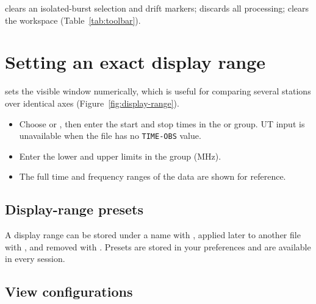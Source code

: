  clears an isolated-burst selection and drift markers;
 discards all processing;  clears the workspace
(Table~\ref{tab:toolbar}).

\section{Setting an exact display range}
\label{sec:display-range}

 sets the visible window numerically, which is useful
for comparing several stations over identical axes (Figure~\ref{fig:display-range}).
\begin{itemize}
  \item Choose  or , then enter the
    start and stop times in the  or  group. UT input is unavailable when
    the file has no \texttt{TIME-OBS} value.
  \item Enter the lower and upper limits in the  group (MHz).
  \item The full time and frequency ranges of the data are shown for reference.
\end{itemize}


\subsection{Display-range presets}

A display range can be stored under a name with , applied later to another file with , and
removed with . Presets are stored in your preferences
and are available in every session.

\subsection{View configurations}
\label{sec:view-config}

